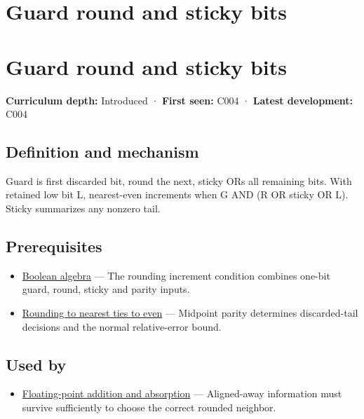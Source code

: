\hypertarget{appendix-b572b631069b}{}
\section*{Guard round and sticky bits}
\section{Guard round and sticky bits}\label{appendix-b572b631069b-guard-round-and-sticky-bits}

\textbf{Curriculum depth:} Introduced · \textbf{First seen:} C004 · \textbf{Latest development:} C004

\subsection{Definition and mechanism}\label{appendix-b572b631069b-definition-and-mechanism}

Guard is first discarded bit, round the next, sticky ORs all remaining bits. With retained low bit L, nearest-even increments when G AND (R OR sticky OR L). Sticky summarizes any nonzero tail.

\subsection{Prerequisites}\label{appendix-b572b631069b-prerequisites}

\begin{itemize}
\tightlist
\item
  \hyperref[appendix-24475e1596a8]{Boolean algebra} --- The rounding increment condition combines one-bit guard, round, sticky and parity inputs.
\item
  \hyperref[appendix-614afe1de592]{Rounding to nearest ties to even} --- Midpoint parity determines discarded-tail decisions and the normal relative-error bound.
\end{itemize}

\subsection{Used by}\label{appendix-b572b631069b-used-by}

\begin{itemize}
\tightlist
\item
  \hyperref[appendix-a1b1b4580dfd]{Floating-point addition and absorption} --- Aligned-away information must survive sufficiently to choose the correct rounded neighbor.
\end{itemize}

